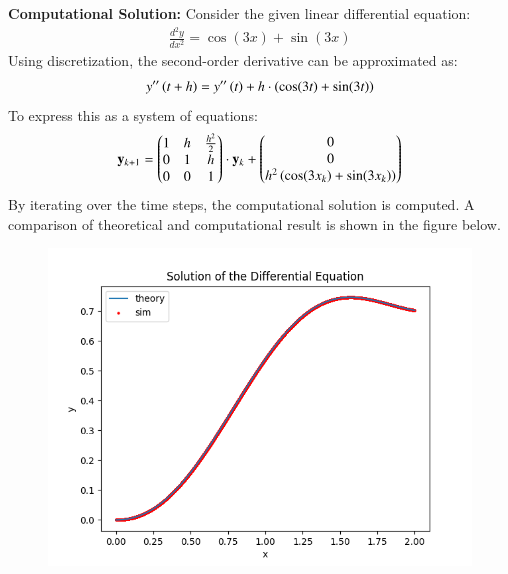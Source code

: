 \documentclass[journal]{IEEEtran}
\begin{document}
\textbf{Computational Solution:}
\newline
Consider the given linear differential equation:
\begin{align}
    \frac{d^2y}{dx^2} = \cos(3x) + \sin(3x)
\end{align}
Using discretization, the second-order derivative can be approximated as:
\begin{align}
    y^{\prime\prime}\left(t+h\right) = y^{\prime\prime}\left(t\right) + h \cdot \left( \cos(3t) + \sin(3t) \right)
\end{align}
\newline
To express this as a system of equations:
\begin{align}
    \mathbf{y}_{k+1} = \begin{pmatrix}1 & h & \frac{h^2}{2}\\ 0 & 1 & h\\ 0 & 0 & 1\end{pmatrix} \cdot \mathbf{y}_k + \begin{pmatrix}0\\ 0\\ h^2\left(\cos(3x_k) + \sin(3x_k)\right)\end{pmatrix}
\end{align}
\newline
By iterating over the time steps, the computational solution is computed. A comparison of theoretical and computational result is shown in the figure below.
\begin{figure}[h!]
   \centering
   \includegraphics[width=\columnwidth]{figs/fig.png}
\end{figure}
\newline
\end{document}
